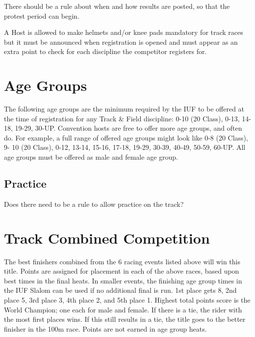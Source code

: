 \begin{comment2016}
There should be a rule about when and how results are posted, so that the
protest period can begin.
\end{comment2016}

A Host is allowed to make helmets and/or knee pads mandatory for track races but it must be announced when registration is opened and must appear as an extra point to check for each discipline the competitor registers for.

\section{Age Groups \label{subsec:track-field_racing-categories_age-groups}}
The following age groups are the minimum required by the IUF to be offered at the time of registration for any Track \& Field discipline: 0-10 (20 Class), 0-13, 14-18, 19-29, 30-UP.
Convention hosts are free to offer more age groups, and often do.
For example, a full range of offered age groups might look like 0-8 (20 Class), 9- 10 (20 Class), 0-12, 13-14, 15-16, 17-18, 19-29, 30-39, 40-49, 50-59, 60-UP.
All age groups must be offered as male and female age group.

\begin{comment2016}
\section{Practice}

Does there need to be a rule to allow practice on the track?
\end{comment2016}

\section{Track Combined Competition}%
The best finishers combined from the 6 racing events listed above will win this title.
Points are assigned for placement in each of the above races, based upon best times in the final heats.
In smaller events, the finishing age group times in the IUF Slalom can be used if no additional final is run.
1st place gets 8, 2nd place 5, 3rd place 3, 4th place 2, and 5th place 1.
Highest total points score is the World Champion; one each for male and female.
If there is a tie, the rider with the most first places wins.
If this still results in a tie, the title goes to the better finisher in the 100m race.
Points are not earned in age group heats.


